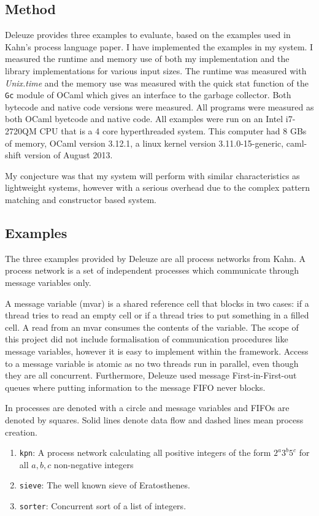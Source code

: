 \documentclass[12pt,twoside,notitlepage]{report}
\begin{document}
\subsection{Method}
Deleuze provides three examples to evaluate, based on the examples used in Kahn's process language paper\cite{kahn1976coroutines}. I have implemented the examples in my system. I measured the runtime and memory use of both my implementation and the library implementations for various input sizes. The runtime was measured with \textit{Unix.time} and the memory use was measured with the quick stat function of the \verb|Gc| module of OCaml which gives an interface to the garbage collector. Both bytecode and native code versions were measured. All programs were measured as both OCaml byetcode and native code. All examples were run on an Intel i7-2720QM CPU that is a 4 core hyperthreaded system. This computer had 8 GBs of memory, OCaml version 3.12.1, a linux kernel version 3.11.0-15-generic, caml-shift version of August 2013.


My conjecture was that my system will perform with similar characteristics as lightweight systems, however with a serious overhead due to the complex pattern matching and constructor based system.
\subsection{Examples}
The three examples provided by Deleuze are all process networks from Kahn\cite{kahn1976coroutines}. A process network is a set of independent processes which communicate through message variables only. 

A message variable (mvar) is a shared reference cell that blocks in two cases: if a thread tries to read an empty cell or if a thread tries to put something in a filled cell. A read from an mvar consumes the contents of the variable. The scope of this project did not include formalisation of communication procedures like message variables, however it is easy to implement within the framework. Access to a message variable is atomic as no two threads run in parallel, even though they are all concurrent. Furthermore, Deleuze used message First-in-First-out queues where putting information to the message FIFO never blocks. 

In  processes are denoted with a circle and message variables and FIFOs are denoted by squares. Solid lines denote data flow and dashed lines mean process creation.
\begin{enumerate}
\item{\verb|kpn|: A process network calculating all positive integers of the form $ 2^a3^b5^c $ for all $ a,b,c $ non-negative integers}
\item{\verb|sieve|: The well known sieve of Eratosthenes.}
\item{\verb|sorter|: Concurrent sort of a list of integers.}
\end{enumerate}
\end{document}
